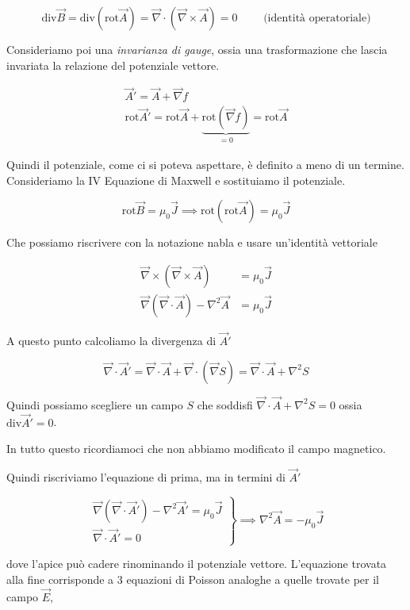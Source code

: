 \[
	\text{div}\vec{B} = \text{div}(\text{rot}\vec{A})= \vec{\nabla} \cdot (\vec{\nabla} \times \vec{A} ) = 0 \qquad \text{ (identità operatoriale)}
\]

Consideriamo poi una \emph{invarianza di gauge}, ossia una trasformazione che lascia invariata la relazione del potenziale vettore.

\begin{gather*}
	\vec{A}' = \vec{A} +\vec{\nabla} f \\
	\text{rot}\vec{A}' = \text{rot}\vec{A} + \underbrace{\text{rot}(\vec{\nabla} f)}_{=0} = \text{rot}\vec{A}
\end{gather*}

Quindi il potenziale, come ci si poteva aspettare, è definito a meno di un termine.
Consideriamo la IV Equazione di Maxwell e sostituiamo il potenziale.

\[
	\text{rot}\vec{B} = \mu_0 \vec{J} \implies \text{rot}(\text{rot}\vec{A} ) = \mu_0  \vec{J}
\]

Che possiamo riscrivere con la notazione nabla e usare un'identità vettoriale

\begin{align*}
	\vec{\nabla} \times (\vec{\nabla} \times \vec{A} ) &= \mu_0 \vec{J} \\
	\vec{\nabla} (\vec{\nabla} \cdot \vec{A} ) - \nabla^2 \vec{A} &= \mu_0 \vec{J}
\end{align*}

A questo punto calcoliamo la divergenza di $ \vec{A}' $

\[
	\vec{\nabla} \cdot \vec{A}' = \vec{\nabla} \cdot \vec{A} +\vec{\nabla} \cdot (\vec{\nabla} S)= \vec{\nabla} \cdot \vec{A} + \nabla^2 S
\]

Quindi possiamo scegliere un campo $ S $ che soddisfi $ \vec{\nabla} \cdot \vec{A} + \nabla^2 S = 0 $ ossia $ \text{div}\vec{A} ' = 0 $.

In tutto questo ricordiamoci che non abbiamo modificato il campo magnetico.

Quindi riscriviamo l'equazione di prima, ma in termini di $\vec{A}'$

\[
	\left. \begin{array}{r}
	 	\vec{\nabla} (\vec{\nabla} \cdot \vec{A}' ) - \nabla^2 \vec{A}' = \mu_0 \vec{J} \\
		\vec{\nabla} \cdot \vec{A} ' = 0
	\end{array} \right\}
	\implies \boxed{ \nabla^2 \vec{A} = -\mu_0 \vec{J}}
\]

dove l'apice può cadere rinominando il potenziale vettore.
L'equazione trovata alla fine corrisponde a 3 equazioni di Poisson analoghe a quelle trovate per il campo $ \vec{E}  $,

